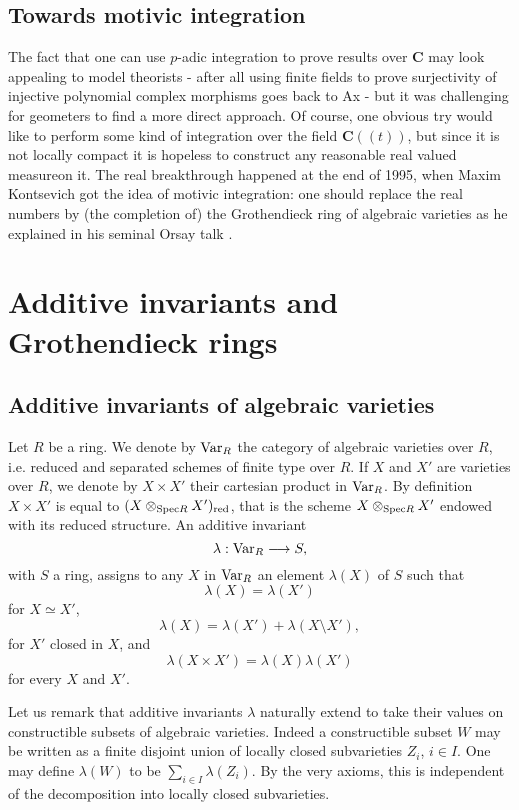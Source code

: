 \documentclass[english,12pt]{amsart}
\def\Spec{{\rm Spec}}
\def\CC{{\mathbf C}}
\theoremstyle{definition}
\theoremstyle{remark}
\theoremstyle{plain}
\numberwithin{equation}{subsection}
\def\CC{{\mathbf C}}
\begin{document}
\subsection{Towards motivic integration}The fact that one
can use $p$-adic integration to prove results over $\CC$  may look appealing
to model theorists - after all
using finite fields to prove surjectivity of injective 
polynomial complex morphisms goes back to Ax \cite{inj} - 
but it was  challenging  for geometers to find a more direct approach.
Of course, one obvious try would like to perform some kind of integration
over the field $\CC ((t))$, but since it is not  locally compact  it
is hopeless to  construct any reasonable
real valued measureon it.
The real breakthrough happened at the end of 1995, when 
Maxim Kontsevich got the idea of motivic integration: one should replace the
real numbers by (the completion of) the Grothendieck ring of algebraic varieties
as he explained in his seminal Orsay talk \cite{maxim}.



\section{Additive invariants and Grothendieck rings}



\subsection{Additive invariants of algebraic varieties}\label{3.1}Let $R$ be a ring. We denote by ${\rm Var}_R$
the category of algebraic varieties over $R$, i.e. reduced and separated schemes of 
finite type over
$R$.
If $X$ and $X'$ are varieties over $R$,
we
denote by $X \times X'$ their cartesian product
in  ${\rm Var}_R$. By definition $X \times X' $
is equal to
$(X \otimes_{\Spec R} X')_{\rm red}$,
that is the scheme $X \otimes_{\Spec R} X'$
endowed with its reduced structure.
An additive invariant
$$
\lambda : 
{\rm Var}_R
\longrightarrow
S,
$$
with $S$ a ring, assigns to any $X$
in ${\rm Var}_R$ an element $\lambda (X)$ of $S$
such that
$$
\lambda (X) = \lambda (X')
$$
for $X \simeq X'$,
$$
\lambda (X) = \lambda (X') + \lambda (X \setminus X'),
$$
for $X'$ closed in $X$,
and
$$
\lambda (X \times X')
=
\lambda (X) \lambda (X')
$$
for every $X$ and $X'$.




Let us remark that additive invariants
$\lambda$ naturally extend to take their values
on
constructible subsets  of algebraic varieties.
Indeed a constructible subset $W$
may be written as a finite
disjoint union of locally closed subvarieties $Z_i$, $i \in I$. One may define
$\lambda (W)$ to be $\sum_{i \in I} \lambda (Z_i)$. By the very axioms, this is independent
of the decomposition into locally closed subvarieties.
\end{document}
